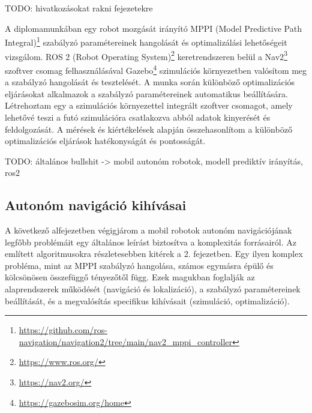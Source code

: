 \chapter{\bevezetes}

TODO: hivatkozásokat rakni fejezetekre

A diplomamunkában egy robot mozgását irányító MPPI (Model Predictive Path Integral)\footnote{\url{https://github.com/ros-navigation/navigation2/tree/main/nav2_mppi_controller}} szabályzó paramétereinek hangolását és optimalizálási lehetőségeit vizsgálom. ROS 2 (Robot Operating System)\footnote{\url{https://www.ros.org/}} keretrendszeren belül a Nav2\footnote{\url{https://nav2.org/}} szoftver csomag felhasználásával Gazebo\footnote{\url{https://gazebosim.org/home}} szimulációs környezetben valósítom meg a szabályzó hangolását és tesztelését. A munka során különböző optimalizációs eljárásokat alkalmazok a szabályzó paramétereinek automatikus beállítására. Létrehoztam egy a szimulációs környezettel integrált szoftver csomagot, amely lehetővé teszi a futó szimulációra csatlakozva abból adatok kinyerését és feldolgozását. A mérések és kiértékelések alapján összehasonlítom a különböző optimalizációs eljárások hatékonyságát és pontosságát.




TODO: általános bullshit -> mobil autonóm robotok, modell prediktív irányítás, ros2

\section{Autonóm navigáció kihívásai}
A következő alfejezetben végigjárom a mobil robotok autonóm navigációjának legfőbb problémáit egy általános leírást biztosítva a komplexitás forrásairól. Az említett algoritmusokra részletesebben kitérek a 2. fejezetben. Egy ilyen komplex probléma, mint az MPPI szabályzó hangolása, számos egymásra épülő és kölcsönösen összefüggő tényezőtől függ. Ezek magukban foglalják az alaprendszerek működését (navigáció és lokalizáció), a szabályzó paramétereinek beállítását, és a megvalósítás specifikus kihívásait (szimuláció, optimalizáció).

